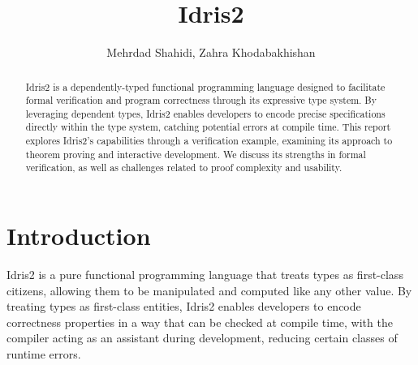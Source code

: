 \documentclass[]{rptuseminar}
\title{Idris2}
\author{Mehrdad Shahidi, Zahra Khodabakhishan
  \institute{Rheinland-Pfälzische Technische Universität Kaiserslautern-Landau, Department of Computer Science}}
\begin{document}

\maketitle


\begin{abstract}
Idris2 is a dependently-typed functional programming language designed to facilitate formal verification and program correctness through its expressive type system. By leveraging dependent types, Idris2 enables developers to encode precise specifications directly within the type system, catching potential errors at compile time. This report explores Idris2's capabilities through a verification example, examining its approach to theorem proving and interactive development. We discuss its strengths in formal verification, as well as challenges related to proof complexity and usability.
\end{abstract}


\section{Introduction}
\label{sec:introduction}
Idris2 is a pure functional programming language that treats types as first-class citizens, allowing them to be manipulated and computed like any other value. By treating types as first-class entities, Idris2 enables developers to encode correctness properties in a way that can be checked at compile time, with the compiler acting as an assistant during development, reducing certain classes of runtime errors.
\end{document}
